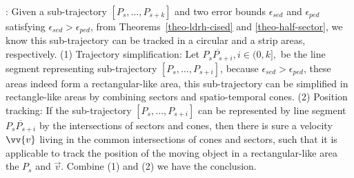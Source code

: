 :
Given a sub-trajectory $[P_s,...,P_{s+k}]$ and two error bounds $\epsilon_{sed}$ and $\epsilon_{ped}$ satisfying $\epsilon_{sed} > \epsilon_{ped}$, from Theorems~\ref{theo-ldrh-cised} and \ref{theo-half-sector}, we know this sub-trajectory can be tracked in a circular and a strip areas, respectively.  
%
(1) Trajectory simplification: Let $\overline{P_sP_{s+i}}, i\in (0,k],$ be the line segment representing sub-trajectory $[P_s,...,P_{s+i}]$, because $\epsilon_{sed} > \epsilon_{ped}$, these areas indeed form a rectangular-like area, \ie this sub-trajectory can be simplified in rectangle-like areas by combining sectors and spatio-temporal cones.
%
(2) Position tracking: If the sub-trajectory $[P_s,...,P_{s+i}]$ can be represented by line segment $\overline{P_sP_{s+i}}$ by the intersections of sectors and cones, then there is sure a velocity $\vv{v}$ living in the common intersections of cones and sectors, such that it is applicable to track the position of the moving object in a rectangular-like area \wrt the $P_s$ and $\vec{v}$. 
Combine (1) and (2) we have the conclusion.
\eop


